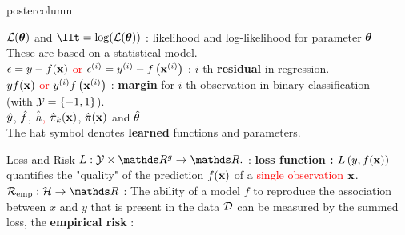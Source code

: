 \documentclass{beamer}
\begin{document}
\begin{frame}[fragile]{}
\begin{columns}
\begin{column}{.31\textwidth}
\begin{beamercolorbox}[center]{postercolumn}
\begin{minipage}{.98\textwidth}
{\begin{myblock}{}
              $\mathcal{L}(\bm{\theta})$ and $\llt = \log(\LLt)$ : likelihood and log-likelihood for parameter $\bm{\theta}$ \\
                \hspace*{1ex}These are based on a statistical model.\\
               
              \textcolor{red}{$\epsilon = y - f(\mathbf{x})$ or} $\epsilon^{(i)} = y^{(i)} - f\left(\mathbf{x}^{(i)}\right)$ : $i$-th \textbf{residual} in regression.\\

              \textcolor{red}{$y f(\mathbf{x})$ or} $y^{(i)} f\left(\mathbf{x}^{(i)}\right)$ : \textbf{margin} for $i$-th observation in binary classification \\
                \hspace*{1ex} (with $\mathcal{Y} = \{-1, 1\}$). \\
              
              $\hat{y}$, $\hat{f}$, \textcolor{red}{$\hat{h}$,} $\hat \pi_{k}(\mathbf{x})$, $\hat \pi(\mathbf{x})$ and $\hat{\theta}$ \\
                \hspace*{1ex}The hat symbol denotes \textbf{learned} functions and parameters.
					\end{myblock}
          \begin{myblock}{Loss and Risk}
				    $L: \Yspace \times \R^g \to \R.$ : \textbf{loss function : } $L\left(y, f(\mathbf{x})\right)$ quantifies the "quality" of the prediction $f(\mathbf{x})$ of a \textcolor{red}{single observation} $\mathbf{x}$.  \\
            
            $\riske:  \Hspace \to \R $ :  The ability of a model $f$ to reproduce the association between $x$ and $y$ that is present in the data $\mathcal{D}$ can be measured by the summed loss, the \textbf{empirical risk }:
            

\end{myblock}}
\end{minipage}
\end{beamercolorbox}
\end{column}
\end{columns}
\end{frame}
\end{document}
